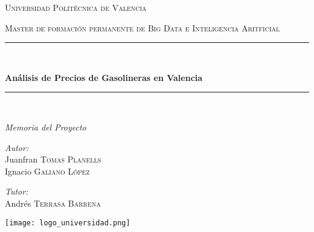 \begin{titlepage}
  \centering
  \vspace*{2cm}

  {\scshape\LARGE Universidad Politécnica de Valencia \par}
  \vspace{1cm}
  {\scshape\Large Master de formación permanente de Big Data e Inteligencia Aritficial\par}
  \vspace{1.5cm}

  \rule{\linewidth}{0.5mm} \\[0.4cm]
  {\huge\bfseries Análisis de Precios de Gasolineras en Valencia\par}
  \rule{\linewidth}{0.5mm} \\

  {\Large\itshape Memoria del Proyecto\par}

  \vfill

  \begin{minipage}[t]{0.4\textwidth}
    \begin{flushleft} \large
      \emph{Autor:}\\
      Juanfran \textsc{Tomas Planells} \\
      Ignacio \textsc{Galiano López}
    \end{flushleft}
  \end{minipage}
  \hfill
  \begin{minipage}[t]{0.4\textwidth}
    \begin{flushleft} \large
      \emph{Tutor:} \\
      Andrés \textsc{Terrasa Barrena}
    \end{flushleft}
  \end{minipage}

  \vfill


  \vspace{1cm}
  \texttt{[image: logo\_universidad.png]}

\end{titlepage}